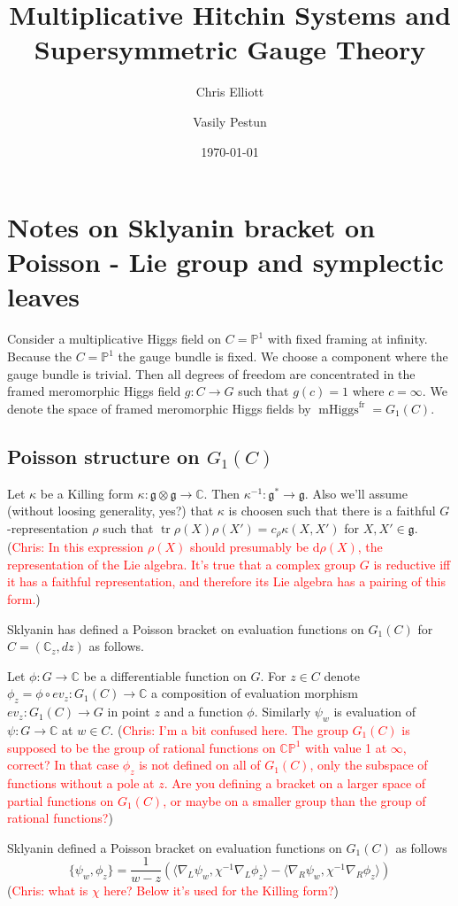 \documentclass[11pt, oneside, reqno]{amsart}
\title{Multiplicative Hitchin Systems and Supersymmetric Gauge Theory}
\author{Chris Elliott \and Vasily Pestun}
\date{\today}
\theoremstyle{definition} \newtheorem{definition}{Definition}[section]
\theoremstyle{definition} \newtheorem{remark}[definition]{Remark}
\theoremstyle{definition} \newtheorem{remarks}[definition]{Remarks}
\theoremstyle{definition} \newtheorem{question}[definition]{Question}
\theoremstyle{definition} \newtheorem*{note}{Note}
\theoremstyle{definition} \newtheorem{example}[definition]{Example}
\theoremstyle{definition} \newtheorem{examples}[definition]{Examples}
\renewcommand{\gg}{\mathfrak{g}}
\newcommand{\bb}[1]{\mathbb{#1}}
\DeclareMathOperator{\tr}{tr}
\DeclareMathOperator{\mhiggs}{mHiggs}
\renewcommand{\d}{\mathrm{d}}
\newcommand{\fr}{\mathrm{fr}}
\newcommand{\chris}[1]{(\textcolor{red}{Chris: #1})}
\begin{document}
\section{Notes on Sklyanin bracket on Poisson - Lie group
  and symplectic leaves}

Consider a multiplicative Higgs field on $C = \mathbb{P}^{1}$
with fixed framing at infinity. Because the $C = \mathbb{P}^{1}$ the
gauge bundle is fixed. We choose a component where the gauge bundle is trivial.
Then all degrees of freedom are concentrated
in the framed meromorphic Higgs field $g: C \to G$ such that $g(c) = 1$ where $c = \infty$. We denote
the space of framed meromorphic Higgs fields by $\mhiggs^{\fr} = G_1(C)$. 

\subsection{Poisson structure on $G_1(C)$} 
Let $\kappa$ be a Killing form $\kappa: \gg \otimes \gg \to \mathbb{C}$.
Then $\kappa^{-1}: \gg^{*} \to \gg$. Also we'll assume  (without loosing generality, yes?)
that $\kappa$ is choosen such that
there is a faithful $G$-representation $\rho$ such that 
$\tr\rho(X) \rho(X') = c_\rho \kappa(X, X') $ for $X , X' \in \gg$. \chris{In this expression $\rho(X)$ should presumably be $\d \rho(X)$, the representation of the Lie algebra.  It's true that a complex group $G$ is reductive iff it has a faithful representation, and therefore its Lie algebra has a pairing of this form.}

Sklyanin has defined a Poisson bracket on evaluation functions on $G_1(C)$ for $C = (\mathbb{C}_z, dz)$ as follows. 

Let $\phi: G \to \mathbb{C}$ be a differentiable function on $G$. For $z \in C$
denote $\phi_{z} =  \phi \circ ev_{z} : G_1(C) \to \mathbb{C}$ a composition
of evaluation morphism  $ev_{z}: G_1(C) \to G$ in point $z$ and a function $\phi$.
Similarly $\psi_{w}$ is evaluation of $\psi: G \to \mathbb{C}$ at $w \in C$.
\chris{I'm a bit confused here.  The group $G_1(C)$ is supposed to be the group of rational functions on $\bb{CP}^1$ with value 1 at $\infty$, correct?  In that case $\phi_z$ is not defined on all of $G_1(C)$, only the subspace of functions without a pole at $z$.  Are you defining a bracket on a larger space of partial functions on $G_1(C)$, or maybe on a smaller group than the group of rational functions?}

Sklyanin defined a Poisson bracket on evaluation functions on $G_1(C)$ as follows
\begin{equation}
\label{eq:Sklyanin}
  \{ \psi_{w}, \phi_{z} \} = \frac{1}{w - z}(\langle \nabla_{L} \psi_w, \chi^{-1} \nabla_{L} \phi_{z}
\rangle  - \langle \nabla_{R} \psi_{w},  \chi^{-1} \nabla_{R} \phi_{z}\rangle)
\end{equation}
\chris{what is $\chi$ here?  Below it's used for the Killing form?}
\end{document}
